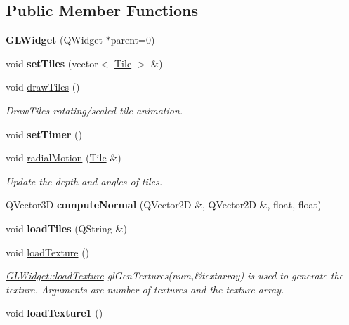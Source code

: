 \subsection*{Public Member Functions}
\begin{DoxyCompactItemize}
\item 
\hypertarget{class_g_l_widget_ab79c391c86de1ffb76f6950b49d82c0c}{}{\bfseries G\+L\+Widget} (Q\+Widget $\ast$parent=0)\label{class_g_l_widget_ab79c391c86de1ffb76f6950b49d82c0c}

\item 
\hypertarget{class_g_l_widget_a8faaa1bdf86f983888fcb40d9d8ac299}{}void {\bfseries set\+Tiles} (vector$<$ \hyperlink{class_tile}{Tile} $>$ \&)\label{class_g_l_widget_a8faaa1bdf86f983888fcb40d9d8ac299}

\item 
void \hyperlink{class_g_l_widget_ac615f919f588064feead6d7121a2c69a}{draw\+Tiles} ()
\begin{DoxyCompactList}\small\item\em Draw\+Tiles rotating/scaled tile animation. \end{DoxyCompactList}\item 
\hypertarget{class_g_l_widget_a1db972c9e72bb07a0266db84bc05576e}{}void {\bfseries set\+Timer} ()\label{class_g_l_widget_a1db972c9e72bb07a0266db84bc05576e}

\item 
void \hyperlink{class_g_l_widget_a3c710ff5b57368382b11c169d393c9b8}{radial\+Motion} (\hyperlink{class_tile}{Tile} \&)
\begin{DoxyCompactList}\small\item\em Update the depth and angles of tiles. \end{DoxyCompactList}\item 
\hypertarget{class_g_l_widget_ad1464ede635f26dddb3751d9e198e1a9}{}Q\+Vector3\+D {\bfseries compute\+Normal} (Q\+Vector2\+D \&, Q\+Vector2\+D \&, float, float)\label{class_g_l_widget_ad1464ede635f26dddb3751d9e198e1a9}

\item 
\hypertarget{class_g_l_widget_a6083f12756d3efaa54552ac7d77e543b}{}void {\bfseries load\+Tiles} (Q\+String \&)\label{class_g_l_widget_a6083f12756d3efaa54552ac7d77e543b}

\item 
\hypertarget{class_g_l_widget_acc3d674e13bcc75f0de5c238957871f3}{}void \hyperlink{class_g_l_widget_acc3d674e13bcc75f0de5c238957871f3}{load\+Texture} ()\label{class_g_l_widget_acc3d674e13bcc75f0de5c238957871f3}

\begin{DoxyCompactList}\small\item\em \hyperlink{class_g_l_widget_acc3d674e13bcc75f0de5c238957871f3}{G\+L\+Widget\+::load\+Texture} gl\+Gen\+Textures(num,\&textarray) is used to generate the texture. Arguments are number of textures and the texture array. \end{DoxyCompactList}\item 
\hypertarget{class_g_l_widget_a12b6753a8d9d1eadc15989210d70a399}{}void {\bfseries load\+Texture1} ()\label{class_g_l_widget_a12b6753a8d9d1eadc15989210d70a399}

\end{DoxyCompactItemize}
